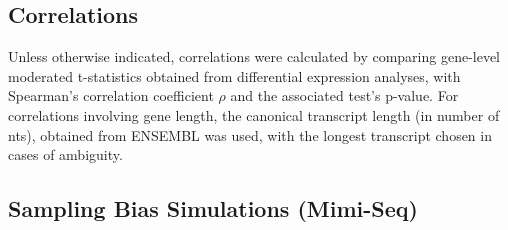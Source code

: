 \subsection{Correlations}
 
Unless otherwise indicated, correlations were calculated by comparing gene-level moderated t-statistics obtained from differential expression analyses, with Spearman’s correlation coefficient $\rho$ and the associated test’s p-value. For correlations involving gene length, the canonical transcript length (in number of \glspl{nt}), obtained from ENSEMBL\cite{cunningham_ensembl_2022} was used, with the longest transcript chosen in cases of ambiguity.

\subsection{Sampling Bias Simulations (Mimi-Seq)}

